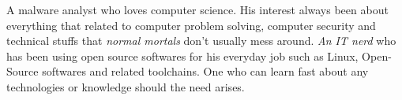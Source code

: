 

\begin{cvparagraph}

A malware analyst who loves computer science. His interest always been about everything that related to computer problem solving, computer security and technical stuffs that \textit{normal mortals} don't usually mess around. \textit{An IT nerd} who has been using open source softwares for his everyday job such as Linux, Open-Source softwares and related toolchains. One who can learn fast about any technologies or knowledge should the need arises.
\end{cvparagraph}
